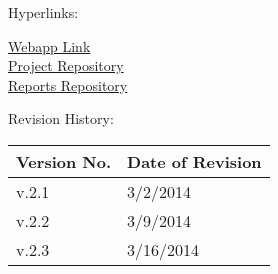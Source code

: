 {

Hyperlinks:\\
\begin{center}
\href{http://192.241.248.91}{Webapp Link}\\
\href{https://github.com/dkarivalis/SEP_SMIFL}{Project Repository}\\
\href{https://github.com/dkarivalis/SEP_SMIFL_reports}{Reports Repository}\\
\end{center}

Revision History:
\begin{longtable}{|p{1.6in}|p{2.6in}|}
\hline
{\large\color{color1}Version No.}&{\large \color{color1}Date of Revision}\\\hline
v.2.1&3/2/2014  \\ \hline
v.2.2&3/9/2014  \\ \hline
v.2.3&3/16/2014  \\ \hline
\end{longtable}

\vspace{20mm}\

}

